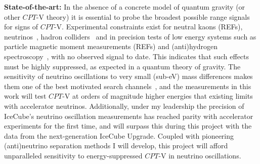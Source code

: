 \documentclass[a4paper,11pt]{article}
\begin{document}

\noindent \textbf{State-of-the-art:} In the absence of a concrete model of quantum gravity (or other $CPT$-V theory) it is essential to probe the broadest possible range signals~\cite{hep-ph/9809542} for signs of $CPT$-V. Experimental constraints exist for neutral kaons (REFs), neutrinos~\cite{Adamson:2013whj, Ohlsson:2014cha}, hadron colliders~\cite{vanTilburg:2016awx} and in precision tests of low energy systems such as particle magnetic moment measurements (REFs) and (anti)hydrogen spectroscopy~\cite{Kostelecky:2015nma}, with no observed signal to date. This indicates that such effects must be highly suppressed, as expected in a quantum theory of gravity. The sensitivity of neutrino oscillations to very small (sub-eV) mass differences makes them one of the best motivated search channels~\cite{PhysRevD.99.075022}, and the measurements in this work will test $CPT$-V at orders of magnitude higher energies that existing limits with accelerator neutrinos. Additionally, under my leadership the precision of IceCube's neutrino oscillation measurements has reached parity with accelerator experiments for the first time, and will surpass this during this project with the data from the next-generation IceCube Upgrade. Coupled with pioneering (anti)neutrino separation methods I will develop, this project will afford unparalleled sensitivity to energy-suppressed $CPT$-V in neutrino oscillations. \\


\end{document}
